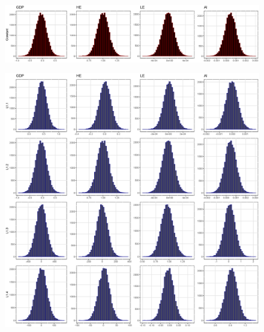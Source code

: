 \documentclass[11pt,preprint, authoryear]{elsarticle}
\let\origfigure\figure
\let\endorigfigure\endfigure
\renewenvironment{figure}[1][2] {
    \expandafter\origfigure\expandafter[H]
} {
    \endorigfigure
}
\numberwithin{equation}{section}
\numberwithin{figure}{section}
\numberwithin{table}{section}
\begin{document}
\begin{figure}
     \centering
     \begin{subfigure}[H]{0.49\textwidth}
         \centering
         \includegraphics[width=\textwidth]{Constant.eps}
     \end{subfigure}
     \begin{subfigure}[H]{0.49\textwidth}
         \centering
         \includegraphics[width=\textwidth]{CoefLag1.eps}
     \end{subfigure}
    \begin{subfigure}[H]{0.49\textwidth}
         \centering

\end{subfigure}
\end{figure}
\end{document}
